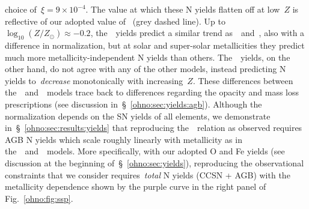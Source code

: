 choice of~$\xi = 9\times10^{-4}$.
The value at which these N yields flatten off at low~$Z$ is reflective of our
adopted value of~ (grey dashed line).
Up to~$\log_{10}(Z / Z_\odot) \approx -0.2$, the~\karakas~yields predict a
similar trend as~\cristallo~and~\ventura, also with a difference in
normalization, but at solar and super-solar metallicities they predict much
more metallicity-independent N yields than others.
The~\karakasten~yields, on the other hand, do not agree with any of the other
models, instead predicting N yields to~\textit{decrease} monotonically with
increasing~$Z$.
These differences between the~\karakasten~and~\karakas~models trace back to
differences regarding the opacity and mass loss prescriptions (see discussion
in~\S~\ref{ohno:sec:yields:agb}).
Although the normalization depends on the SN yields of all elements, we
demonstrate in~\S~\ref{ohno:sec:results:yields} that reproducing the~\ohno~relation
as observed requires AGB N yields which scale roughly linearly with metallicity
as in the~\cristallo~and~\ventura~models.
More specifically, with our adopted O and Fe yields (see discussion at the
beginning of~\S~\ref{ohno:sec:yields}), reproducing the observational constraints
that we consider requires~\textit{total} N yields (CCSN + AGB) with the
metallicity dependence shown by the purple curve in the right panel of
Fig.~\ref{ohno:fig:ssp}.

